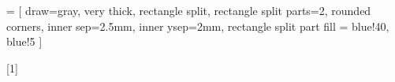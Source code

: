  = [
draw=gray, very thick,
rectangle split, rectangle split parts=2, rounded corners, inner sep=2.5mm, inner ysep=2mm,
rectangle split part fill = {blue!40, blue!5}
]

\newcommand{\charset}[2]{\llbracket #1 \rrbracket_{#2}}

\newenvironment{scprooftree}
{\leavevmode\hbox\bgroup}
{\DisplayProof\egroup}

[1]{%
\begin{center}
\end{center}
}